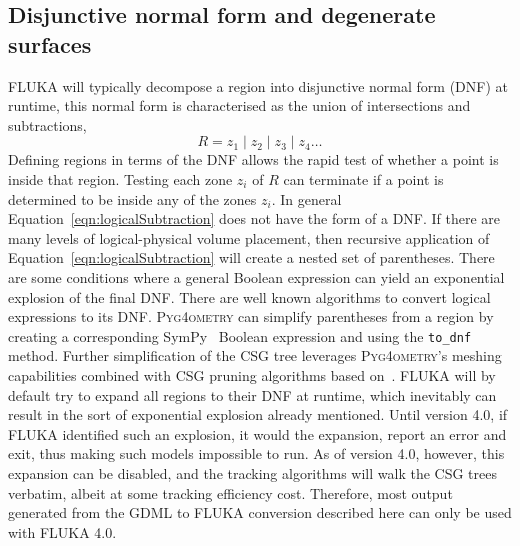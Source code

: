 \documentclass[final,5p,times,twocolumn]{elsarticle}
\newcommand{\PYGEOMETRY}{\textsc{Pyg4ometry}}
\begin{document}
\subsection{Disjunctive normal form and degenerate surfaces}
FLUKA will typically decompose a region into disjunctive normal form (DNF)
at runtime, this normal form is characterised as the union of intersections and subtractions,
\begin{equation}
R = z_1 \; | \;z_2\;  | \; z_3 	\; | \; z_4 \dots
\end{equation}
Defining regions in terms of the DNF allows the rapid test of whether a point is inside that region. Testing each zone
$z_i$ of $R$ can terminate if a point is determined to be inside any of the zones $z_i$. In general
Equation~\ref{eqn:logicalSubtraction} does not have the form of a DNF. If there are many levels of logical-physical volume
placement, then recursive application of  Equation~\ref{eqn:logicalSubtraction} will create a nested set of
parentheses. There are some conditions where a general Boolean expression can yield an exponential
explosion of the final DNF. There are well known algorithms to convert logical expressions to its DNF.
\PYGEOMETRY{} can simplify parentheses from a region by creating a corresponding SymPy~\cite{10.7717/peerj-cs.103} Boolean
expression and using the \verb|to_dnf| method.  Further simplification of the CSG tree leverages \PYGEOMETRY{}'s
meshing capabilities combined with CSG pruning algorithms based
on~\cite{pruning}.  FLUKA will by default try to expand all regions to
their DNF at runtime, which inevitably can result in the sort of exponential explosion already mentioned.  Until version 4.0, if FLUKA identified
such an explosion, it would the expansion, report an error and exit, thus making such models impossible to run.  As of version 4.0, however, this
expansion can be disabled, and the tracking algorithms will walk the CSG trees verbatim, albeit at some tracking efficiency cost.  Therefore, most
output generated from the GDML to FLUKA conversion described here can only be used with FLUKA 4.0.
\end{document}
